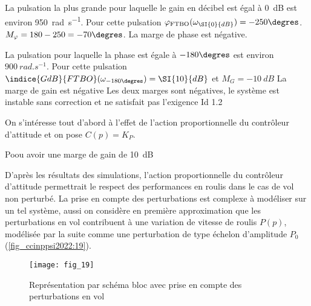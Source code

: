 \ifprof
\begin{corrige}
La pulsation la plus grande pour laquelle le gain en décibel est égal à \SI{0}{dB} est environ \SI{950}{rad.s^{-1}}. Pour cette pulsation $\varphi_{\text{FTBO}} (\omega_{\SI{0}{dB}} )=-250\degres$.
$M_{\varphi}=180-250=-70\degres$. La marge de phase est négative. 

La pulsation pour laquelle la phase est égale à $-180\degres$ est environ $\SI{900}{rad.s^{-1}}$. Pour cette pulsation $\indice{GdB}{FTBO}(\omega_{-180\degres} )=\SI{10}{dB}$ et $M_G=-\SI{10}{dB}$
La marge de gain est négative
Les deux marges sont négatives, le système est instable sans correction et ne satisfait pas l’exigence Id 1.2

\end{corrige}
\else
\fi

On s’intéresse tout d’abord à l’effet de l’action proportionnelle du contrôleur d’attitude et on
pose $C(p) = K_P$.


\ifprof
\begin{corrige}
Poou avoir une marge de gain de \SI{10}{dB} 
\end{corrige}
\else
\fi


D’après les résultats des simulations, l’action proportionnelle du contrôleur d’attitude permettrait le respect des performances en roulis dans le cas de vol non perturbé. La prise en
compte des perturbations est complexe à modéliser sur un tel système, aussi on considère
en première approximation que les perturbations en vol contribuent à une variation de vitesse
de roulis $P(p)$, modélisée par la suite comme une perturbation de type échelon d’amplitude $P_0$
(\autoref{fig_ccinppsi2022:19}).

\begin{figure}[H]
\centering
\texttt{[image: fig\_19]}
\caption{\label{fig_ccinppsi2022:19} Représentation par schéma bloc avec prise en compte des perturbations en vol}
\end{figure}


\ifprof
\begin{corrige}
\end{corrige}
\else
\fi

